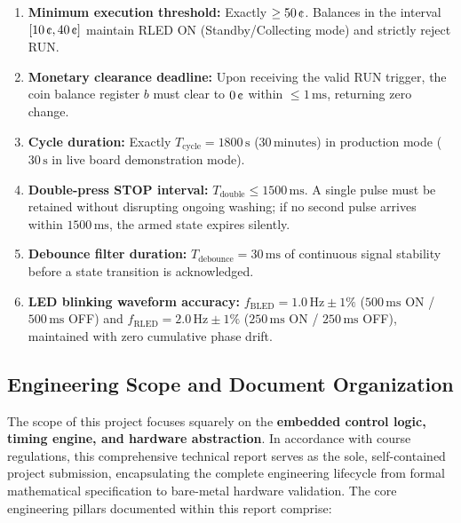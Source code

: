 \begin{enumerate}
  \item \textbf{Minimum execution threshold:} Exactly $\ge 50\,\text{\cent}$. Balances in the interval
    $[10\,\text{\cent}, 40\,\text{\cent}]$ maintain RLED ON (Standby/Collecting mode) and strictly reject RUN.
  \item \textbf{Monetary clearance deadline:} Upon receiving the valid RUN trigger, the coin balance register
    $b$ must clear to $0\,\text{\cent}$ within $\le 1\,\text{ms}$, returning zero change.
  \item \textbf{Cycle duration:} Exactly $T_{\text{cycle}} = 1800\,\text{s}$ ($30\,\text{minutes}$) in production mode
    ($30\,\text{s}$ in live board demonstration mode).
  \item \textbf{Double-press STOP interval:} $T_{\text{double}} \le 1500\,\text{ms}$. A single pulse must be
    retained without disrupting ongoing washing; if no second pulse arrives within $1500\,\text{ms}$, the armed
    state expires silently.
  \item \textbf{Debounce filter duration:} $T_{\text{debounce}} = 30\,\text{ms}$ of continuous signal stability
    before a state transition is acknowledged.
  \item \textbf{LED blinking waveform accuracy:} $f_{\text{BLED}} = 1.0\,\text{Hz} \pm 1\%$ ($500\,\text{ms}$ ON / $500\,\text{ms}$ OFF)
    and $f_{\text{RLED}} = 2.0\,\text{Hz} \pm 1\%$ ($250\,\text{ms}$ ON / $250\,\text{ms}$ OFF), maintained with zero cumulative phase drift.
\end{enumerate}

\subsection{Engineering Scope and Document Organization}

The scope of this project focuses squarely on the \textbf{embedded control logic, timing engine, and hardware abstraction}.
In accordance with course regulations, this comprehensive technical report serves as the sole, self-contained project submission, encapsulating the complete engineering lifecycle from formal mathematical specification to bare-metal hardware validation. The core engineering pillars documented within this report comprise:


